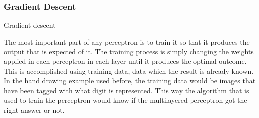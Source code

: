 \subsubsection{Gradient Descent}

Gradient descent 


The most important part of any perceptron is to train it so that it produces the output that is expected of it. The training process is simply changing the weights applied in each perceptron in each layer until it produces the optimal outcome. This is accomplished using training data, data which the result is already known. In the hand drawing example used before, the training data would be images that have been tagged with what digit is represented. This way the algorithm that is used to train the perceptron would know if the multilayered perceptron got the right answer or not.
